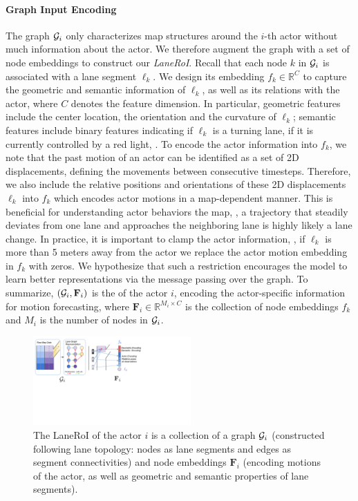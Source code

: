 \paragraph{Graph Input Encoding}
The graph $\mathcal{G}_i$ only characterizes map structures around the $i$-th actor without much information about the actor.
We therefore augment the graph with a set of node embeddings to
construct our \textit{LaneRoI}.
Recall that each node $k$ in $\mathcal{G}_i$ is associated with a lane
segment $\ell_k$. We design its embedding $f_k \in \mathbb{R}^C$ 
to capture the geometric and semantic information of
$\ell_k$, as well as its relations with the actor, where $C$ denotes the feature
dimension.
In particular, geometric features include the center location, the orientation and the
curvature of $\ell_k$; semantic features include binary features indicating if
$\ell_k$ is a turning lane,  if it is currently controlled by a red light,
\etc. To encode the actor information into $f_k$, we note that the past motion of an
actor can be identified as a set of 2D displacements, defining the 
movements between consecutive timesteps. Therefore, we also include the relative
positions and orientations of these 2D displacements \wrt $\ell_k$
into $f_k$ which encodes actor motions in a map-dependent manner.
This is beneficial for understanding actor behaviors \wrt the map, \eg, a trajectory that 
steadily deviates from one lane and approaches the neighboring lane is highly likely 
a lane change.
In practice, it is important to clamp the actor information, \ie, if $\ell_k$ is more than 5 meters away from the
actor we replace the actor motion embedding in $f_k$ with zeros. 
We hypothesize that such a restriction encourages the model to learn better representations via the message passing over the graph.
To summarize, $(\mathcal{G}_i, \mathbf{F}_i)$ is the \ROI of the actor $i$, encoding
the actor-specific information for motion forecasting,
where $\mathbf{F}_i \in
\mathbb{R}^{M_i \times C}$ is the collection of node embeddings $f_k$ and 
$M_i$ is the number of nodes in $\mathcal{G}_i$. 

\begin{figure}[t]
\begin{center}
  \includegraphics[height=3.4cm]{figures/laneroi.pdf}
\end{center}
\vspace{-0.2cm}
\caption{
The LaneRoI of the actor $i$ is a collection of a graph $\mathcal{G}_i$ (constructed following lane topology: nodes as
lane segments and edges as segment connectivities) and node
embeddings $\mathbf{F}_i$ (encoding motions of the actor, as well as
geometric and semantic properties of lane segments).}
\vspace{-0.3cm}
\label{fig:laneroi}
\end{figure}


